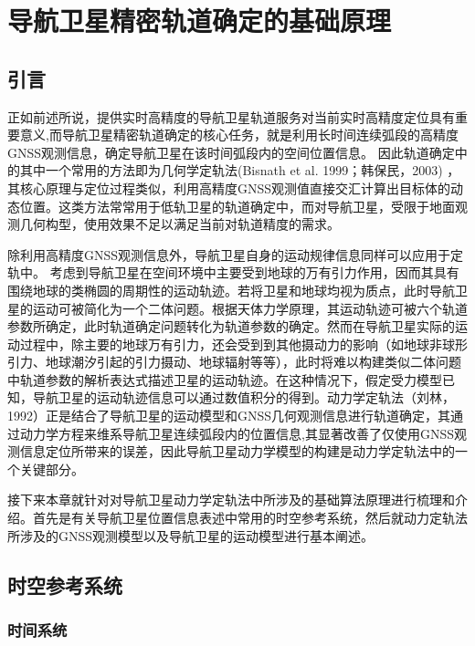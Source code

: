 
\chapter{导航卫星精密轨道确定的基础原理}

\section{引言}

正如前述所说，提供实时高精度的导航卫星轨道服务对当前实时高精度定位具有重要意义,而导航卫星精密轨道确定的核心任务，就是利用长时间连续弧段的高精度GNSS观测信息，确定导航卫星在该时间弧段内的空间位置信息。
因此轨道确定中的其中一个常用的方法即为几何学定轨法(Bisnath et al. 1999；韩保民，2003) ，其核心原理与定位过程类似，利用高精度GNSS观测值直接交汇计算出目标体的动态位置。这类方法常常用于低轨卫星的轨道确定中，而对导航卫星，受限于地面观测几何构型，使用效果不足以满足当前对轨道精度的需求。

除利用高精度GNSS观测信息外，导航卫星自身的运动规律信息同样可以应用于定轨中。
考虑到导航卫星在空间环境中主要受到地球的万有引力作用，因而其具有围绕地球的类椭圆的周期性的运动轨迹。若将卫星和地球均视为质点，此时导航卫星的运动可被简化为一个二体问题。根据天体力学原理，其运动轨迹可被六个轨道参数所确定，此时轨道确定问题转化为轨道参数的确定。然而在导航卫星实际的运动过程中，除主要的地球万有引力，还会受到到其他摄动力的影响（如地球非球形引力、地球潮汐引起的引力摄动、地球辐射等等），此时将难以构建类似二体问题中轨道参数的解析表达式描述卫星的运动轨迹。在这种情况下，假定受力模型已知，导航卫星的运动轨迹信息可以通过数值积分的得到。动力学定轨法（刘林，1992）正是结合了导航卫星的运动模型和GNSS几何观测信息进行轨道确定，其通过动力学方程来维系导航卫星连续弧段内的位置信息,其显著改善了仅使用GNSS观测信息定位所带来的误差，因此导航卫星动力学模型的构建是动力学定轨法中的一个关键部分。

接下来本章就针对对导航卫星动力学定轨法中所涉及的基础算法原理进行梳理和介绍。首先是有关导航卫星位置信息表述中常用的时空参考系统，然后就动力定轨法所涉及的GNSS观测模型以及导航卫星的运动模型进行基本阐述。

\section{时空参考系统}

\subsection{时间系统}


